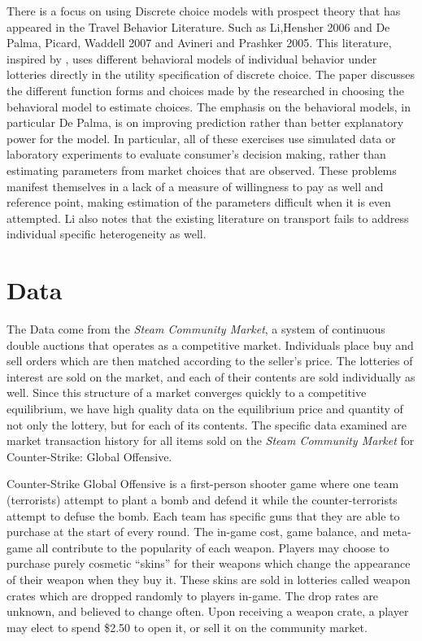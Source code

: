 \documentclass[12pt]{paper}
\begin{document}
There is a focus on using Discrete choice models with prospect theory
that has appeared in the Travel Behavior Literature. Such as
Li,Hensher 2006 and De Palma, Picard, Waddell 2007 and Avineri and
Prashker 2005. This literature, inspired by \cite*{dePalmaEtAl}, uses
different behavioral models of individual behavior under lotteries
directly in the utility specification of discrete choice. The paper
discusses the different function forms and choices made by the
researched in choosing the behavioral model to estimate choices.  The
emphasis on the behavioral models, in particular De Palma, is on
improving prediction rather than better explanatory power for the
model. In particular, all of these exercises use simulated data or
laboratory experiments to evaluate consumer's decision making, rather
than estimating parameters from market choices that are
observed. These problems manifest themselves in a lack of a measure of
willingness to pay as well and reference point, making estimation of
the parameters difficult when it is even attempted. Li also notes that
the existing literature on transport fails to address individual
specific heterogeneity as well.


\section{Data}

The Data come from the \emph{Steam Community Market}, a system of
continuous double auctions that operates as a competitive
market. Individuals place buy and sell orders which are then matched
according to the seller's price. The lotteries of interest are sold on
the market, and each of their contents are sold individually as
well. Since this structure of a market converges quickly to a
competitive equilibrium, we have high quality data on the equilibrium
price and quantity of not only the lottery, but for each of its
contents. The specific data examined are market transaction history
for all items sold on the \emph{Steam Community Market} for
Counter-Strike: Global Offensive.

Counter-Strike Global Offensive is a first-person shooter game where
one team (terrorists) attempt to plant a bomb and defend it while the
counter-terrorists attempt to defuse the bomb. Each team has specific
guns that they are able to purchase at the start of every round. The
in-game cost, game balance, and meta-game all contribute to the
popularity of each weapon. Players may choose to purchase purely
cosmetic ``skins'' for their weapons which change the appearance of
their weapon when they buy it. These skins are sold in lotteries
called weapon crates which are dropped randomly to players
in-game. The drop rates are unknown, and believed to change
often. Upon receiving a weapon crate, a player may elect to spend
\$2.50 to open it, or sell it on the community market.
\end{document}
